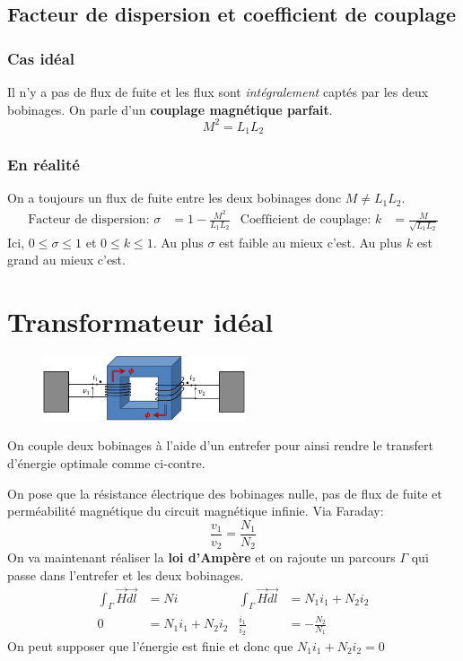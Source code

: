 \documentclass{report}
\begin{document}
\subsection{Facteur de dispersion et coefficient de couplage}
\subsubsection{Cas idéal}
Il n'y a pas de flux de fuite et les flux sont \textit{intégralement} captés par les deux bobinages. On parle d'un \textbf{couplage magnétique parfait}.
\begin{equation}
M^2 = L_1 L_2
\end{equation}

\subsubsection{En réalité}
On a toujours un flux de fuite entre les deux bobinages donc $M \neq L_1 L_2$.
\begin{align*}
\text{Facteur de dispersion: } \sigma &= 1 - \frac{M^2}{L_1 L_2} & \text{Coefficient de couplage: } k &= \frac{M}{\sqrt{L_1 L_2}}
\end{align*}
Ici, $0 \leqslant \sigma \leqslant 1$ et $0 \leqslant k \leqslant 1$. Au plus $\sigma$ est faible au mieux c'est. Au plus $k$ est grand au mieux c'est.

\section{Transformateur idéal}
\begin{figure}
\centering
\includegraphics[width=6cm]{img/transfoBobinages.png}
\end{figure}
On couple deux bobinages à l'aide d'un entrefer pour ainsi rendre le transfert d'énergie optimale comme ci-contre.\par
On pose que la résistance électrique des bobinages nulle, pas de flux de fuite et perméabilité magnétique du circuit magnétique infinie. Via Faraday:
\begin{equation}
\frac{v_1}{v_2} = \frac{N_1}{N_2}
\end{equation}
On va maintenant réaliser la \textbf{loi d'Ampère} et on rajoute un parcours $\Gamma$ qui passe dans l'entrefer et les deux bobinages.
\begin{align*}
\int_{\Gamma} \overrightarrow{H} \overrightarrow{dl} &= N i & \int_{\Gamma} \overrightarrow{H} \overrightarrow{dl} &= N_1 i_1 + N_2 i_2\\
0 &= N_1 i_1 + N_2 i_2 & \frac{i_1}{i_2} &= - \frac{N_2}{N_1}
\end{align*}
On peut supposer que l'énergie est finie et donc que $N_1 i_1 + N_2 i_2 = 0$
\end{document}
